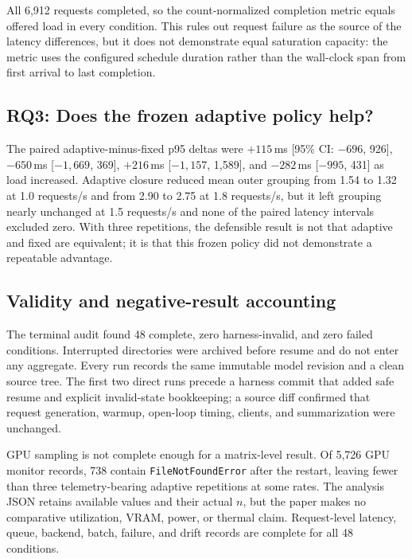 All 6,912 requests completed, so the count-normalized completion metric equals
offered load in every condition. This rules out request failure as the source
of the latency differences, but it does not demonstrate equal saturation
capacity: the metric uses the configured schedule duration rather than the
wall-clock span from first arrival to last completion.

\subsection{RQ3: Does the frozen adaptive policy help?}

\AdaptiveFinding{} The paired adaptive-minus-fixed p95 deltas were
$+115$\,ms [95\% CI: $-696$, 926],
$-650$\,ms [$-1{,}669$, 369],
$+216$\,ms [$-1{,}157$, 1,589], and
$-282$\,ms [$-995$, 431] as load increased. Adaptive closure reduced mean
outer grouping from 1.54 to 1.32 at 1.0 requests/s and from 2.90 to 2.75 at
1.8 requests/s, but it left grouping nearly unchanged at 1.5 requests/s and
none of the paired latency intervals excluded zero. With three repetitions,
the defensible result is not that adaptive and fixed are equivalent; it is
that this frozen policy did not demonstrate a repeatable advantage.


\subsection{Validity and negative-result accounting}

The terminal audit found 48 complete, zero harness-invalid, and zero failed
conditions. Interrupted directories were archived before resume and do not
enter any aggregate. Every run records the same immutable model revision and
a clean source tree. The first two direct runs precede a harness commit that
added safe resume and explicit invalid-state bookkeeping; a source diff
confirmed that request generation, warmup, open-loop timing, clients, and
summarization were unchanged.

GPU sampling is not complete enough for a matrix-level result. Of 5,726 GPU
monitor records, 738 contain \texttt{FileNotFoundError} after the restart,
leaving fewer than three telemetry-bearing adaptive repetitions at some rates.
The analysis JSON retains available values and their actual $n$, but the paper
makes no comparative utilization, VRAM, power, or thermal claim. Request-level
latency, queue, backend, batch, failure, and drift records are complete for all
48 conditions.

\FloatBarrier
